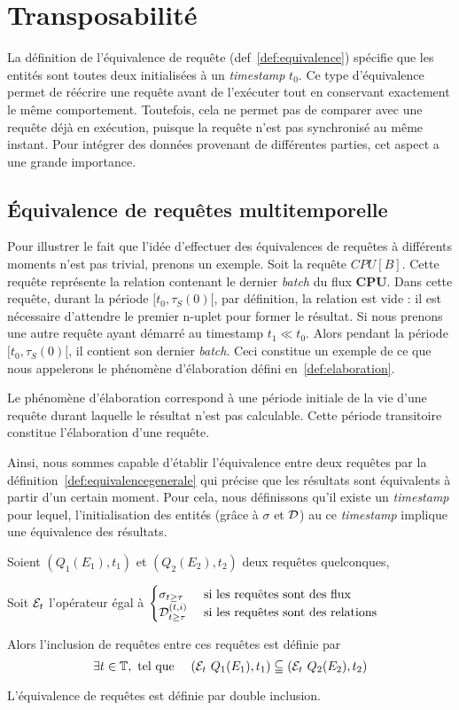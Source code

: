 \section{Transposabilité}\label{sec:contrib:astral:transposabilite}
La définition de l'équivalence de requête (def~\ref{def:equivalence}) spécifie que les entités sont toutes deux initialisées à un \textit{timestamp} $t_0$. Ce type d'équivalence permet de réécrire une requête avant de l'exécuter tout en conservant exactement le même comportement. Toutefois, cela ne permet pas de comparer avec une requête déjà en exécution, puisque la requête n'est pas synchronisé au même instant. Pour intégrer des données provenant de différentes parties, cet aspect a une grande importance.
\subsection{Équivalence de requêtes multitemporelle}
Pour illustrer le fait que l'idée d'effectuer des équivalences de requêtes à différents moments n'est pas trivial, prenons un exemple. Soit la requête $CPU[B]$. Cette requête représente la relation contenant le dernier \textit{batch} du flux \textbf{CPU}. Dans cette requête, durant la période $[t_0,\tau_S(0)[$, par définition, la relation est vide : il est nécessaire d'attendre le premier n-uplet pour former le résultat. Si nous prenons une autre requête ayant démarré au timestamp $t_1 \ll t_0$. Alors pendant la période $[t_0,\tau_S(0)[$, il contient son dernier \textit{batch}. Ceci constitue un exemple de ce que nous appelerons le phénomène d'élaboration défini en~\ref{def:elaboration}.
\begin{defi}\label{def:elaboration}
    Le phénomène d'élaboration correspond à une période initiale de la vie d'une requête durant laquelle le résultat n'est pas calculable. Cette période transitoire constitue l'élaboration d'une requête.
\end{defi}

Ainsi, nous sommes capable d'établir l'équivalence entre deux requêtes par la définition~\ref{def:equivalencegenerale} qui précise que les résultats sont équivalents à partir d'un certain moment. Pour cela, nous définissons qu'il existe un \textit{timestamp} pour lequel, l'initialisation des entités (grâce à $\sigma$ et $\mathcal{D}$) au ce \textit{timestamp} implique une équivalence des résultats.
\begin{defi}\label{def:equivalencegenerale}
    Soient $(Q_1(E_1),t_1)$ et $(Q_2(E_2),t_2)$ deux requêtes quelconques,

    Soit $\mathcal{E}_t$ l'opérateur égal à $\begin{cases} \sigma_{t\geq \tau} & \textrm{ si les requêtes sont des flux}\\ \mathcal{D}_{t\geq \tau}^{(t,i)} & \textrm{  si les requêtes sont des relations}\end{cases}$

    Alors l'inclusion de requêtes entre ces requêtes est définie par $$\exists t \in \mathbb{T}, \textrm{ tel que } \quad (\mathcal{E}_t\ Q_1(E_1), t_1) \subseteqq (\mathcal{E}_t\  Q_2(E_2), t_2)$$

    L'équivalence de requêtes est définie par double inclusion.
\end{defi}

